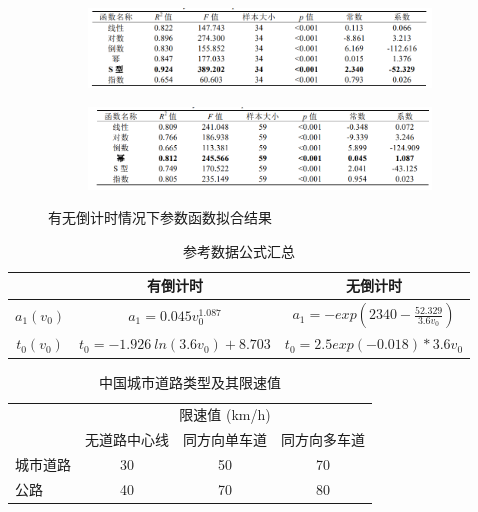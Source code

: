 \documentclass[withoutpreface,bwprint]{cumcmthesis}
\begin{document}
\begin{itemize}
\begin{figure}[htbp!]
		\bigskip %
		\begin{subfigure}[t]{0.47\textwidth}
			\centering
			\includegraphics[width=\textwidth]{pics/fyc3}
			\label{fig:down3}
		\end{subfigure}
		\hfill %
		\begin{subfigure}[t]{0.47\textwidth}
			\centering
			\includegraphics[width=\textwidth]{pics/fyc4}
			\label{fig:down4}
		\end{subfigure}
		\caption{有无倒计时情况下参数函数拟合结果}
		\label{fig:ref}
	\end{figure}

\end{itemize}


\begin{table}[htbp!]
	\centering
	\begin{tabular}{| c | c | c |} %
		\hline
		& \large 有倒计时 & \large 无倒计时 \\ %
		\hline
		\large$a_1(v_0)$ &\large $a_1 = 0.045v_0^{1.087}$ & \large$a_1 = -exp(2340-\frac{52.329}{3.6v_0})$ \\
		\hline
		\large$t_0(v_0)$ & \large$t_0 = -1.926\ ln(3.6v_0)+8.703$ & \large$t_0 = 2.5exp(-0.018)*3.6v_0$ \\
		\hline
	\end{tabular}
	\caption{参考数据公式汇总}
	\label{tab:3x3-table}
\end{table}
\begin{table}[h]
	\centering
	\begin{tabular}{m{5cm}ccc}
		\toprule
		 & \multicolumn{3}{c}{限速值 (km/h)} \\
		\cmidrule{2-4}
		& 无道路中心线 & 同方向单车道& 同方向多车道\\
		\midrule
		城市道路 & 30 & 50 & 70\\
		公路 & 40 & 70& 80\\
		\bottomrule
	\end{tabular}
	\caption{中国城市道路类型及其限速值}
	\label{tab:speed_limits}
\end{table}
\end{document}
